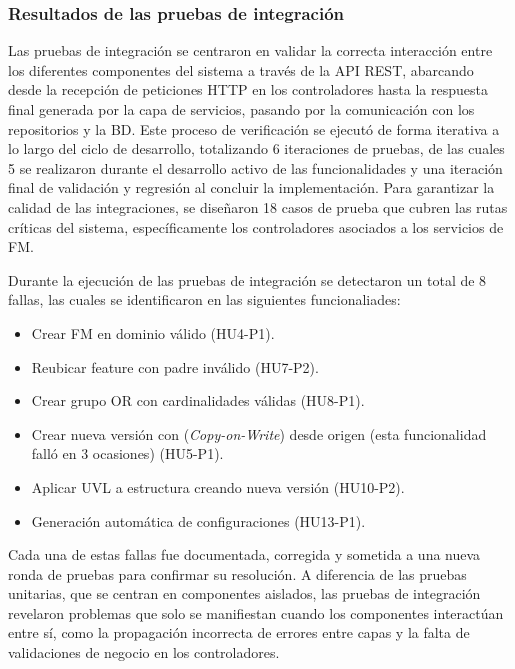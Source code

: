\subsubsection{Resultados de las pruebas de integración}

Las pruebas de integración se centraron en validar la correcta interacción entre los diferentes componentes del 
sistema a través de la \ac{API} \ac{REST}, abarcando desde la recepción de peticiones \ac{HTTP} en los controladores 
hasta la respuesta final generada por la capa de servicios, pasando por la comunicación con los repositorios y 
la \ac{BD}. Este proceso de verificación se ejecutó de forma iterativa a lo largo del ciclo de desarrollo, 
totalizando 6 iteraciones de pruebas, de las cuales 5 se realizaron durante el desarrollo activo de las funcionalidades 
y una iteración final de validación y regresión al concluir la implementación. Para garantizar la calidad de las 
integraciones, se diseñaron 18 casos de prueba que cubren las rutas críticas del sistema, específicamente los 
controladores asociados a los servicios de \ac{FM}.

Durante la ejecución de las pruebas de integración se detectaron un total de 8 fallas, las cuales se identificaron 
en las siguientes funcionaliades:

\begin{itemize}
    \item Crear \ac{FM} en dominio válido (HU4-P1).
    \item Reubicar feature con padre inválido (HU7-P2).
    \item Crear grupo OR con cardinalidades válidas (HU8-P1).
    \item Crear nueva versión con (\textit{Copy-on-Write}) desde origen (esta funcionalidad falló en 3 ocasiones) (HU5-P1).
    \item Aplicar UVL a estructura creando nueva versión (HU10-P2).
    \item Generación automática de configuraciones (HU13-P1). 
\end{itemize}

Cada una de estas fallas fue documentada, corregida y sometida a una nueva ronda 
de pruebas para confirmar su resolución. A diferencia de las pruebas unitarias, que se centran en componentes 
aislados, las pruebas de integración revelaron problemas que solo se manifiestan cuando los componentes 
interactúan entre sí, como la propagación incorrecta de errores entre capas y la falta de validaciones de negocio 
en los controladores.

